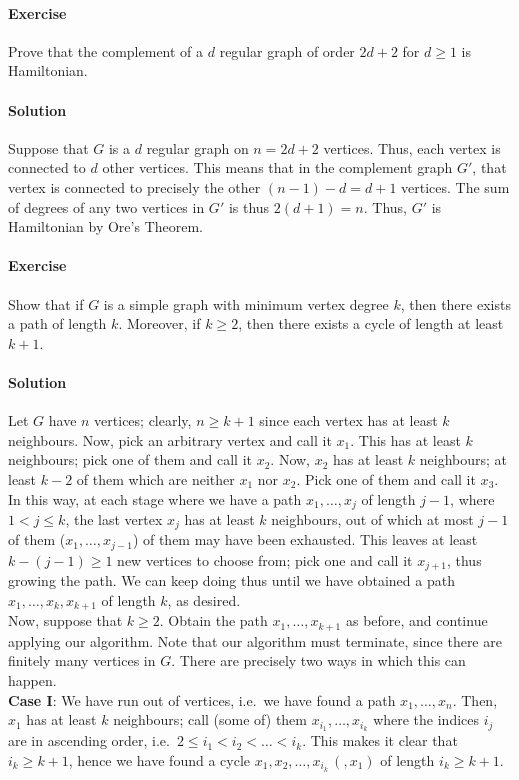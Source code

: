 \documentclass[10pt]{article}
\newcounter{prob}
\newcommand{\problem}{\stepcounter{prob}\paragraph{Exercise \arabic{prob}}}
\newcommand{\solution}{\paragraph{Solution}}
\begin{document}
    \problem Prove that the complement of a $d$ regular graph of order $2d + 2$ for
    $d \geq 1$ is Hamiltonian.

    \solution Suppose that $G$ is a $d$ regular graph on $n = 2d + 2$ vertices. Thus,
    each vertex is connected to $d$ other vertices. This means that in the complement
    graph $G'$, that vertex is connected to precisely the other $(n - 1) - d = d + 1$
    vertices. The sum of degrees of any two vertices in $G'$ is thus $2(d + 1) = n$.
    Thus, $G'$ is Hamiltonian by Ore's Theorem.


    \problem Show that if $G$ is a simple graph with minimum vertex degree $k$, then
    there exists a path of length $k$. Moreover, if $k \geq 2$, then there exists a
    cycle of length at least $k + 1$.

    \solution Let $G$ have $n$ vertices; clearly, $n \geq k + 1$ since each vertex
    has at least $k$ neighbours. Now, pick an arbitrary vertex and call it $x_1$.
    This has at least $k$ neighbours; pick one of them and call it $x_2$. Now, $x_2$
    has at least $k$ neighbours; at least $k - 2$ of them which are neither $x_1$ nor
    $x_2$. Pick one of them and call it $x_3$. In this way, at each stage where we
    have a path $x_1, \dots, x_j$ of length $j - 1$, where $1 < j \leq k$, the last
    vertex $x_j$ has at least $k$ neighbours, out of which at most $j - 1$ of them
    ($x_1, \dots, x_{j - 1}$) of them may have been exhausted. This leaves at least
    $k - (j - 1) \geq 1$ new vertices to choose from; pick one and call it $x_{j +
    1}$, thus growing the path. We can keep doing thus until we have obtained a path
    $x_1, \dots, x_k, x_{k + 1}$ of length $k$, as desired. \\

    Now, suppose that $k \geq 2$. Obtain the path $x_1, \dots, x_{k + 1}$ as before,
    and continue applying our algorithm. Note that our algorithm must terminate,
    since there are finitely many vertices in $G$. There are precisely two ways in
    which this can happen. \\

    \textbf{Case I}: We have run out of vertices, i.e.\ we have found a path $x_1,
    \dots, x_n$. Then, $x_1$ has at least $k$ neighbours; call (some of) them $x_{i_1}, \dots,
    x_{i_k}$ where the indices $i_j$ are in ascending order, i.e.\ $2 \leq i_1 < i_2
    < \dots < i_k$. This makes it clear that $i_k \geq k + 1$, hence we have found a
    cycle $x_1, x_2, \dots, x_{i_k}\,(, x_1)$ of length $i_k \geq k + 1$. \\
\end{document}
